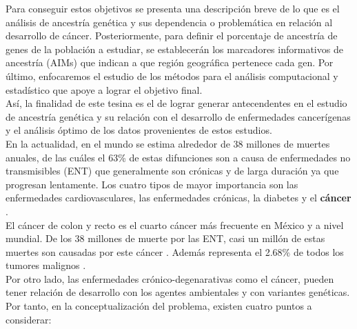 Para conseguir estos objetivos se presenta una descripción breve de lo que es el análisis de ancestría genética y sus dependencia o problem\'atica en relación al desarrollo de cáncer. Posteriormente, para definir el porcentaje de ancestría de genes de la población a estudiar, se establecer\'an los marcadores informativos de ancestría (AIMs) que indican a que región geográfica pertenece cada gen. Por último, enfocaremos el estudio de los métodos para el análisis computacional y estadístico que apoye a lograr el objetivo final. \\

Así, la finalidad de este tesina es el de lograr generar antecendentes en el estudio de ancestría genética y su relación con el desarrollo de enfermedades cancerígenas y el análisis óptimo de los datos provenientes de estos estudios.\\


En la actualidad, en el mundo se estima alrededor de 38 millones de muertes anuales, de las cuáles el 63\% de estas difunciones son a causa de enfermedades no transmisibles (ENT) que generalmente son crónicas y de larga duración ya que progresan lentamente. Los cuatro tipos de mayor importancia son las enfermedades cardiovasculares, las enfermedades crónicas, la diabetes y el \textbf{cáncer} \cite{INEGI}.\\


El cáncer de colon y recto es el cuarto cáncer m\'as frecuente en México y a nivel mundial. De los 38 millones de muerte por las ENT, casi un millón de estas muertes son causadas por este cáncer \cite{INSP}. Además representa el 2.68\% de todos los tumores malignos \cite{Dario}. \\


Por otro lado, las enfermedades crónico-degenarativas como el cáncer, pueden tener relación de desarrollo con los agentes ambientales \cite{Weinberg} y con variantes gen\'eticas. \\

Por tanto, en la conceptualizaci\'on del problema, existen cuatro puntos a considerar: \\

